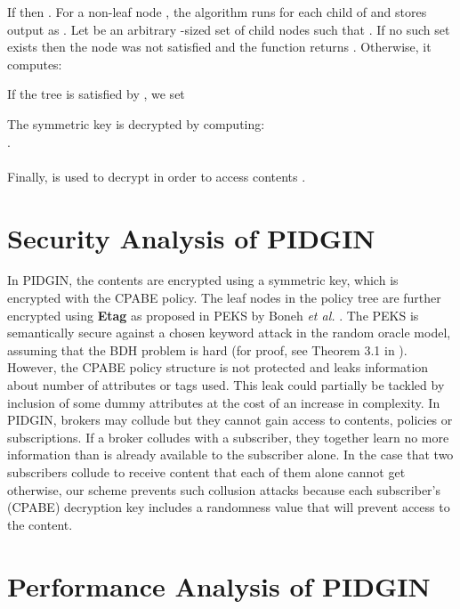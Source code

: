 \documentclass[epsfig,a4paper,11pt,titlepage]{book}
\numberwithin{algorithm}{chapter}
\begin{document}
If  then . 
For a non-leaf node , the algorithm runs  for each child  of  and stores output as . Let  be an arbitrary -sized set of child nodes  such that . If no such set exists then the node was not satisfied and the function returns . Otherwise, it computes:

If the tree is satisfied by , we set

The symmetric key is decrypted by computing: \\
. \\ \\
Finally,  is used to decrypt  in order to access contents .


\section[Security Analysis of PIDGIN]{Security Analysis of \gls{PIDGIN}}
\label{sec:pidgin-security-analysis}

In \gls{PIDGIN}, the contents are encrypted using a symmetric key, which is encrypted with the \gls{CPABE} policy. The leaf nodes in the policy tree are further encrypted using \textbf{Etag} as proposed in \gls{PEKS} by Boneh \emph{et al.} \cite{Boneh:2004}. The \gls{PEKS} is semantically secure against a chosen keyword attack in the random oracle model, assuming that the \gls{BDH} problem is hard (for proof, see Theorem 3.1 in \cite{Boneh:2004}). However, the \gls{CPABE} policy structure is not protected and leaks information about number of attributes or tags used. This leak could partially be tackled by inclusion of some dummy attributes at the cost of an increase in complexity. In \gls{PIDGIN}, brokers may collude but they cannot gain access to contents, policies or subscriptions. If a broker colludes with a subscriber, they together learn no more information than is already available to the subscriber alone. In the case that two subscribers collude to receive content that each of them alone cannot get otherwise, our scheme prevents such collusion attacks because each subscriber's (\gls{CPABE}) decryption key includes a randomness value that will prevent access to the content.

\section[Performance Analysis of PIDGIN]{Performance Analysis of \gls{PIDGIN}}
\label{sec:pidgin-analysis}
\end{document}
